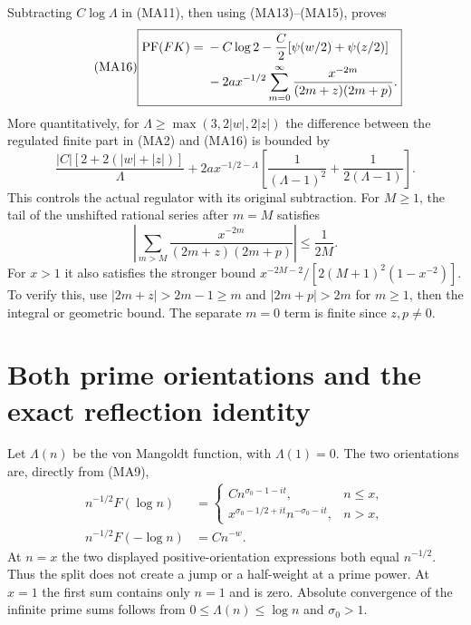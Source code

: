 \documentclass[11pt,a4paper]{article}
\begin{document}
Subtracting $C\log\Lambda$ in (MA11), then using (MA13)--(MA15), proves
\begin{equation}\tag{MA16}\boxed{\begin{aligned}
 \operatorname{PF}(FK)={}&-C\log2
 -\frac C2[\psi(w/2)+\psi(z/2)]\\
 &-2a x^{-1/2}\sum_{m=0}^\infty
       \frac{x^{-2m}}{(2m+z)(2m+p)}.
\end{aligned}}\end{equation}
More quantitatively, for
$\Lambda\ge\max(3,2|w|,2|z|)$ the difference between the regulated finite
part in (MA2) and (MA16) is bounded by
\begin{equation}\tag{MA17}
 \frac{|C|[2+2(|w|+|z|)]}{\Lambda}
 +2a x^{-1/2-\Lambda}
 \left[\frac1{(\Lambda-1)^2}+\frac1{2(\Lambda-1)}\right].
\end{equation}
This controls the actual regulator with its original subtraction.
For $M\ge1$, the tail of the unshifted rational series after $m=M$ satisfies
\begin{equation}\tag{MA18}
 \left|\sum_{m>M}\frac{x^{-2m}}{(2m+z)(2m+p)}\right|
 \le\frac1{2M}.
\end{equation}
For $x>1$ it also satisfies the stronger bound
$x^{-2M-2}/[2(M+1)^2(1-x^{-2})]$.
To verify this, use $|2m+z|>2m-1\ge m$ and $|2m+p|>2m$ for $m\ge1$,
then the integral or geometric bound. The separate $m=0$ term is finite
since $z,p\ne0$.

\section{Both prime orientations and the exact reflection identity}
Let $\Lambda(n)$ be the von Mangoldt function, with $\Lambda(1)=0$.
The two orientations are, directly from (MA9),
\begin{equation}\tag{MA19}\begin{aligned}
 n^{-1/2}F(\log n)
 &=\begin{cases}
 Cn^{\sigma_0-1-it},& n\le x,\\
 x^{\sigma_0-1/2+it}n^{-\sigma_0-it},& n>x,
 \end{cases}\\
 n^{-1/2}F(-\log n)&=Cn^{-w}.
\end{aligned}\end{equation}
At $n=x$ the two displayed positive-orientation expressions both equal
$n^{-1/2}$. Thus the split does not create a jump or a half-weight at
a prime power. At $x=1$ the first sum contains only $n=1$ and is zero.
Absolute convergence of the infinite prime sums follows from
$0\le\Lambda(n)\le\log n$ and $\sigma_0>1$.
\end{document}
